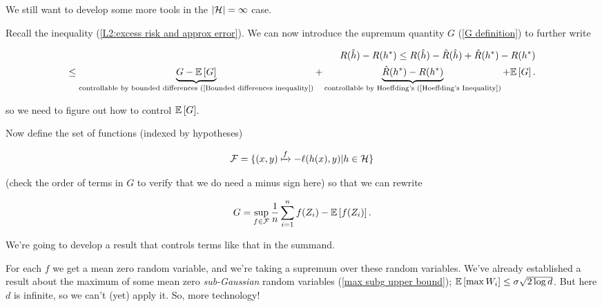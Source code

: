 \documentclass[11pt]{scrartcl}
\begin{document}
We still want to develop some more tools in the $|\mathcal{H}| = \infty$ case.

Recall the inequality (\ref{L2:excess risk and approx error}). We can now introduce the supremum quantity $G$ (\ref{G definition}) to further write

\begin{align}
    R(\hat{h}) - R(h^*) \le R(\hat{h}) - \hat{R}(\hat{h}) + \hat{R}(h^*) - R(h^*) \\
    \le \underbrace{G - \mathbb{E} \left[ G \right]}_{\text{controllable by bounded differences (\ref{Bounded differences inequality})}} + \underbrace{\hat{R}(h^*) - R(h^*)}_{\text{controllable by Hoeffding's (\ref{Hoeffding's Inequality})}} + \mathbb{E} \left[ G \right].
\end{align}

so we need to figure out how to control $\mathbb{E} \left[ G \right]$.

Now define the set of functions (indexed by hypotheses)

\begin{equation}
    \mathcal{F} = \{ (x,y) \xmapsto{f} - \ell(h(x), y) | h \in \mathcal{H} \}
    \label{F for losses}
\end{equation}

(check the order of terms in $G$ to verify that we do need a minus sign here) so that we can rewrite

\begin{equation}
    G = \sup_{f \in \mathcal{F}} \frac1n \sum_{i=1}^n f(Z_i) - \mathbb{E} \left[ f(Z_i) \right].
\end{equation}

We're going to develop a result that controls terms like that in the summand.

For each $f$ we get a mean zero random variable, and we're taking a supremum over these random variables. We've already established a result about the maximum of some mean zero \textit{sub-Gaussian} random variables (\ref{max subg upper bound}); $\mathbb{E} \left[ \max W_i \right] \le \sigma \sqrt{2 \log d}$. But here $d$ is infinite, so we can't (yet) apply it. So, more technology!


\end{document}
